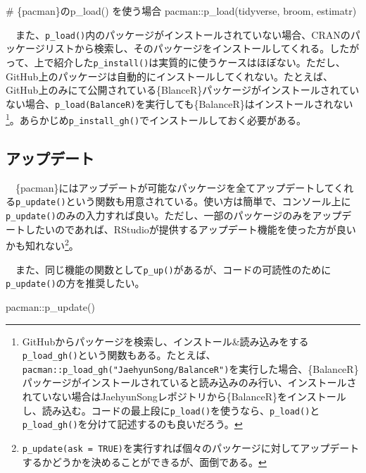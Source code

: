 \documentclass[
  a4paper,
  pandoc,
  ja=standard,
  jafont=haranoaji]{bxjsbook}
\newenvironment{Shaded}{\begin{snugshade}}{\end{snugshade}}
\newcommand{\CommentTok}[1]{\textcolor[rgb]{0.37,0.37,0.37}{#1}}
\newcommand{\FunctionTok}[1]{\textcolor[rgb]{0.28,0.35,0.67}{#1}}
\newcommand{\NormalTok}[1]{\textcolor[rgb]{0.00,0.48,0.65}{#1}}
\newcommand{\SpecialCharTok}[1]{\textcolor[rgb]{0.37,0.37,0.37}{#1}}
\begin{document}
\begin{Shaded}
\begin{Highlighting}[numbers=left,,]
\CommentTok{\# \{pacman\}のp\_load() を使う場合}
\NormalTok{pacman}\SpecialCharTok{::}\FunctionTok{p\_load}\NormalTok{(tidyverse, broom, estimatr)}
\end{Highlighting}
\end{Shaded}

　また、\texttt{p\_load()}内のパッケージがインストールされていない場合、CRANのパッケージリストから検索し、そのパッケージをインストールしてくれる。したがって、上で紹介した\texttt{p\_install()}は実質的に使うケースはほぼない。ただし、GitHub上のパッケージは自動的にインストールしてくれない。たとえば、GitHub上のみにて公開されている\{BlanceR\}パッケージがインストールされていない場合、\texttt{p\_load(BalanceR)}を実行しても\{BalanceR\}はインストールされない\footnote{GitHubからパッケージを検索し、インストール\&読み込みをする\texttt{p\_load\_gh()}という関数もある。たとえば、\texttt{pacman::p\_load\_gh("JaehyunSong/BalanceR")}を実行した場合、\{BalanceR\}パッケージがインストールされていると読み込みのみ行い、インストールされていない場合はJaehyunSongレポジトリから\{BalanceR\}をインストールし、読み込む。コードの最上段に\texttt{p\_load()}を使うなら、\texttt{p\_load()}と\texttt{p\_load\_gh()}を分けて記述するのも良いだろう。}。あらかじめ\texttt{p\_install\_gh()}でインストールしておく必要がある。

\hypertarget{ux30a2ux30c3ux30d7ux30c7ux30fcux30c8}{%
\subsection{アップデート}\label{ux30a2ux30c3ux30d7ux30c7ux30fcux30c8}}

　\{pacman\}にはアップデートが可能なパッケージを全てアップデートしてくれる\texttt{p\_update()}という関数も用意されている。使い方は簡単で、コンソール上に\texttt{p\_update()}のみの入力すれば良い。ただし、一部のパッケージのみをアップデートしたいのであれば、RStudioが提供するアップデート機能を使った方が良いかも知れない\footnote{\texttt{p\_update(ask\ =\ TRUE)}を実行すれば個々のパッケージに対してアップデートするかどうかを決めることができるが、面倒である。}。

　また、同じ機能の関数として\texttt{p\_up()}があるが、コードの可読性のために\texttt{p\_update()}の方を推奨したい。

\begin{Shaded}
\begin{Highlighting}[numbers=left,,]
\NormalTok{pacman}\SpecialCharTok{::}\FunctionTok{p\_update}\NormalTok{()}
\end{Highlighting}
\end{Shaded}
\end{document}
